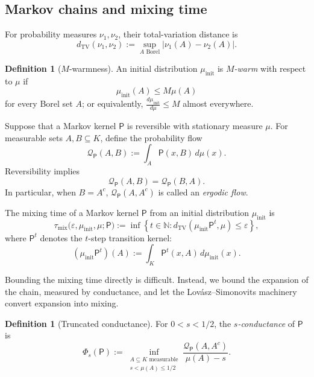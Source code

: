 \documentclass[11pt]{article}
\theoremstyle{definition}
\newtheorem{definition}[theorem]{Definition}
\theoremstyle{remark}
\newcommand{\cQ}{\mathcal Q}
\newcommand{\dtv}{d_{\mathrm{TV}}}
\newcommand{\mix}{\mathrm{mix}}
\begin{document}
\subsection{Markov chains and mixing time}
For probability measures \(\nu_1,\nu_2\), their total-variation distance is
\[
 \dtv(\nu_1,\nu_2)
 :=
 \sup_{A\text{ Borel}}
 \bigl|\nu_1(A)-\nu_2(A)\bigr|.
\]
\begin{definition}[$M$-warmness]
An initial distribution \(\mu_{\mathrm{init}}\) is
\emph{\(M\)-warm} with respect to \(\mu\) if
\[
 \mu_{\mathrm{init}}(A)\le M\mu(A)
\]
for every Borel set \(A\); or equivalently,
\(\frac{d\mu_{\mathrm{init}}}{d\mu}\le M\) almost everywhere.    
\end{definition}


Suppose that a Markov kernel \(\mathsf P\) is reversible with stationary measure \(\mu\).
For measurable sets \(A,B\subseteq K\), define the probability flow
\begin{equation}\label{eq:stationary-flow}
 \cQ_{\mathsf P}(A,B)
 :=
 \int_A\mathsf P(x,B)\,d\mu(x).
\end{equation}
Reversibility implies
\[
 \cQ_{\mathsf P}(A,B)
 =
 \cQ_{\mathsf P}(B,A).
\]
In particular, when $B=A^c$, $\cQ_{\mathsf P}(A,A^c)$ is called an \emph{ergodic flow}.

The mixing time of a Markov kernel \(\mathsf P\) from an initial distribution \(\mu_{\mathrm{init}}\) is
\begin{equation}\label{eq:mixing-time}
 \tau_{\mix}
 \bigl(
   \varepsilon,\mu_{\mathrm{init}},\mu;\mathsf P
 \bigr)
 :=
 \inf\left\{
 t\in\mathbb N:
 \dtv(\mu_{\mathrm{init}}\mathsf P^t,\mu)
 \le\varepsilon
 \right\},
\end{equation}
where \(\mathsf P^t\) denotes the \(t\)-step transition kernel:
\[
 (\mu_{\mathrm{init}}\mathsf P^t)(A)
 :=
 \int_K \mathsf P^t(x,A)\,d\mu_{\mathrm{init}}(x).
\]

Bounding the mixing time directly is difficult.  Instead, we bound the
expansion of the chain, measured by conductance, and let the
Lov\'asz--Simonovits machinery convert expansion into mixing.

\begin{definition}[Truncated conductance]
For \(0<s<1/2\), the \emph{\(s\)-conductance} of \(\mathsf P\) is
\begin{equation}\label{eq:s-conductance}
 \Phi_s(\mathsf P)
 :=
 \inf_{\substack{A\subseteq K\text{ measurable}\\s<\mu(A)\le1/2}}
 \frac{
   \cQ_{\mathsf P}(A,A^c)
 }{
   \mu(A)-s
 }.
\end{equation}
\end{definition}
\end{document}
